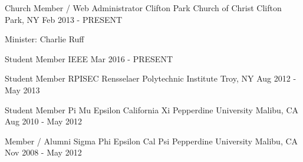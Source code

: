 

\begin{cventries}

  \cventry
    {Church Member / Web Administrator} %
    {Clifton Park Church of Christ} %
    {Clifton Park, NY} %
    {Feb 2013 - PRESENT} %
    {
      \begin{cvitems}
        \item {Minister: Charlie Ruff}
      \end{cvitems}
    }

  \cventryshort
    {Student Member} %
    {IEEE} %
    {} %
    {Mar 2016 - PRESENT} %

  \cventryshort
    {Student Member} %
    {RPISEC \dotSep Rensselaer Polytechnic Institute} %
    {Troy, NY} %
    {Aug 2012 - May 2013} %

  \cventryshort
    {Student Member} %
    {Pi Mu Epsilon \dotSep California Xi \dotSep Pepperdine University} %
    {Malibu, CA} %
    {Aug 2010 - May 2012} %

  \cventryshort
    {Member / Alumni} %
    {Sigma Phi Epsilon \dotSep Cal Psi \dotSep Pepperdine University} %
    {Malibu, CA} %
    {Nov 2008 - May 2012} %

\end{cventries}
